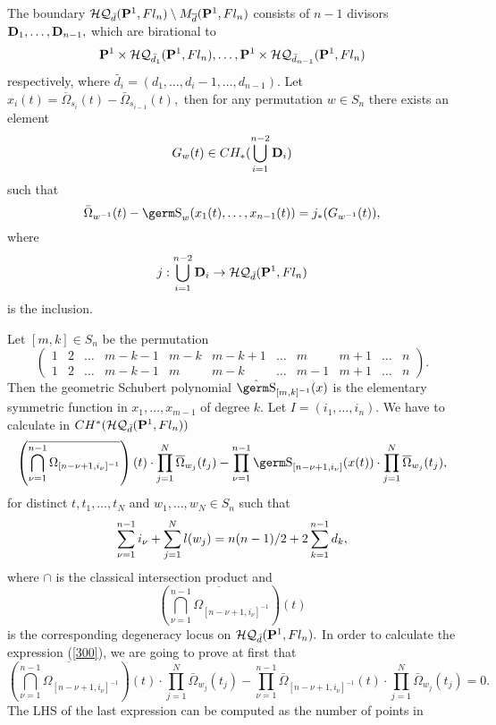 {{The boundary ${\cal HQ}_{\bar{d}}({\bf P}^1,Fl_n)
\setminus M_{\overline{d}}({\bf P}^1,Fl_n)$ consists of 
$n-1$ divisors ${\bf D}_1,\ldots,{\bf D}_{n-1},$ 
which are birational to 
$${\bf P}^1 \times 
{\cal HQ}_{\bar{d}_1}({\bf P}^1,Fl_n),\ldots ,
{\bf P}^1 \times 
{\cal HQ}_{\bar{d}_{n-1}}({\bf P}^1,Fl_n)
$$ 
respectively, where $\bar{d}_{i}=(d_1,\ldots,d_i-1,\ldots,d_{n-1}).$ 
Let $x_i(t) = \overline{\Omega}_{s_i}(t) - 
\bar{\Omega}_{s_{i-1}}(t),$ 
then for any permutation $w\in S_n$ 
there exists an element 
$$G_w(t)\in CH_{\ast}(\bigcup_{i=1}^{n-2}{\bf D}_i)
$$ 
such that 
\[ \bar{\Omega}_{w^{-1}}(t)-\s_w(x_1(t),\ldots ,x_{n-1}(t)) 
= j_{\ast}(G_{w^{-1}}(t)), \]
where 
\[ j:\bigcup_{i=1}^{n-2}{\bf D}_i \rightarrow 
{\cal HQ}_{\bar{d}}({\bf P}^1,Fl_n) \] 
is the inclusion. 

Let $[m,k]\in S_n$ be the permutation 
\[ \left( 
\begin{array}{cccccccccccc}
1 & 2 & \ldots & m-k-1 & m-k & m-k+1 &\ldots & m & m+1 & \ldots 
 & n \\ 
1 & 2 & \ldots & m-k-1 & m & m-k &\ldots & m-1 & m+1 & \ldots 
 & n 
\end{array}
\right) . \] 
Then the geometric Schubert polynomial $\hat{\s}_{[m,k]^{-1}}(x)$ is 
the elementary symmetric function in $x_1,\ldots ,x_{m-1}$ 
of degree $k.$ Let $I=(i_1,\ldots,i_n).$ 
We have to calculate in $CH^{\ast}({\cal HQ}_{\bar{d}}
({\bf P}^1,Fl_n))$ 
\begin{equation} \left( \overline{  
\bigcap_{\nu =1}^{n-1}\Omega_{[n-\nu+1,i_{\nu}]^{-1}}} \right) (t)
\cdot \prod_{j=1}^{N}\overline{\Omega}_{w_j}(t_j) - 
\prod_{\nu =1}^{n-1}\s_{[n-\nu+1,i_{\nu}]}(x(t)) 
\cdot \prod_{j=1}^{N}\overline{\Omega}_{w_j}(t_j), \label{300}
\end{equation}
for distinct $t,t_1,\ldots, t_N$ and 
$w_1,\ldots ,w_N\in S_n$ such that 
$$\displaystyle\sum_{\nu=1}^{n-1}i_{\nu}
+\displaystyle\sum_{j=1}^{N}l(w_j) = n(n-1)/2 + 2\displaystyle\sum_{k=1}^{n-1} d_k,
$$ 
where $\cap$ is the classical intersection product and 
\[ \left( \overline{  
\bigcap_{\nu =1}^{n-1}\Omega_{[n-\nu+1,i_{\nu}]^{-1}} } \right) (t) \] 
is the corresponding degeneracy locus on 
${\cal HQ}_{\bar{d}}({\bf P}^1,Fl_n).$ 
In order to calculate the expression (\ref{300}), we are going to prove
at first that
\[ \left( \overline{ \bigcap_{\nu =1}^{n-1}
\Omega_{[n-\nu +1,i_{\nu}]^{-1}}} \right) (t) \cdot
\prod_{j=1}^{N}\bar{\Omega}_{w_j}(t_j) -
\prod_{\nu =1}^{n-1}
\bar{\Omega}_{[n-\nu +1,i_{\nu}]^{-1}} (t)
\cdot
\prod_{j=1}^{N}\bar{\Omega}_{w_j} (t_j) = 0 .\]
The LHS of the last expression can be computed as the number of points in
}}
